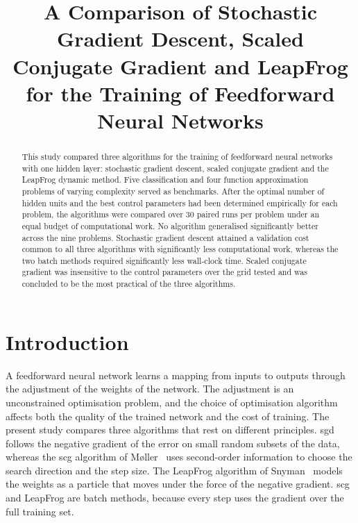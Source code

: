 \documentclass[conference]{IEEEtran}
\begin{document}
\title{A Comparison of Stochastic Gradient Descent, Scaled Conjugate Gradient and LeapFrog for the Training of Feedforward Neural Networks}

\author{
}

\maketitle

\begin{abstract}
This study compared three algorithms for the training of feedforward neural
networks with one hidden layer: stochastic gradient descent, scaled conjugate
gradient and the LeapFrog dynamic method. Five classification and four function
approximation problems of varying complexity served as benchmarks. After the
optimal number of hidden units and the best control parameters had been
determined empirically for each problem, the algorithms were compared over 30
paired runs per problem under an equal budget of computational work. No algorithm generalised significantly better across the
nine problems. Stochastic gradient descent attained a validation cost common to all three
algorithms with significantly less computational work, whereas the two batch methods required
significantly less wall-clock time. Scaled conjugate gradient was insensitive to
the control parameters over the grid tested and was concluded to be the most practical of the
three algorithms.
\end{abstract}

\section{Introduction}

A feedforward neural network learns a mapping from inputs to outputs through the
adjustment of the weights of the network. The adjustment is an unconstrained
optimisation problem, and the choice of optimisation algorithm affects both the
quality of the trained network and the cost of training. The present study
compares three algorithms that rest on different principles. \Gls{sgd} follows
the negative gradient of the error on small random subsets of the data, whereas the
\gls{scg} algorithm of M{\o}ller~\cite{moller1993} uses second-order information
to choose the search direction and the step size. The LeapFrog algorithm of
Snyman~\cite{snyman1982,snyman1983} models the weights as a particle that moves
under the force of the negative gradient. \Gls{scg} and LeapFrog are batch methods,
because every step uses the gradient over the full training set.
\end{document}
